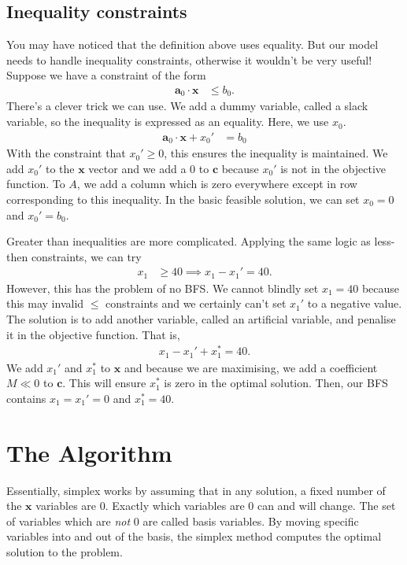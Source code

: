 \documentclass[12pt,a4paper]{article} %
\begin{document}
\subsection{Inequality constraints}
You may have noticed that the definition above uses 
equality. But our model needs to handle inequality constraints, otherwise 
it wouldn't be very useful! Suppose we have a constraint of the form 
\begin{align*}
    \bm a_0 \cdot \bm x &\le b_0.
\end{align*}
There's a clever trick we can use. We add a dummy variable, called a 
slack variable, so the inequality is expressed as an equality. 
Here, we use $x_0$.
\begin{align*}
    \bm a_0 \cdot \bm x + x_0' &= b_0
\end{align*}
With the constraint that $x_0' \ge 0$, this ensures the inequality is 
maintained. 
We add $x_0'$ to the $\bm x$ vector 
and we add a $0$ to $\bm c$ because $x_0'$ is not in the objective function. To $A$, we add 
a column which is zero everywhere except in row corresponding to
this inequality. In the basic feasible solution, we can set 
$x_0=0$ and $x_0' = b_0$.

Greater than inequalities are more complicated. Applying the same logic 
as less-then constraints, we can try
\begin{align*}
    x_1 &\ge 40 \implies x_1-x_1' = 40.
\end{align*}
However, this has the problem of no BFS. We cannot blindly set $x_1=40$ 
because this may invalid $\le$ constraints and we certainly
can't set $x_1'$ to a negative value. The solution is to add another 
variable, called an artificial variable, and penalise it in the objective 
function. That is, 
\begin{align*}
    x_1 - x_1' + x_1^* = 40.
\end{align*}
We add $x_1'$ and $x_1^*$ to $\bm x$ and because we are maximising, 
we add a coefficient $M \ll 0$ to $\bm c$. This will 
ensure $x_1^*$ is zero in the optimal solution. Then, our BFS contains 
$x_1 = x_1' = 0$ and $x_1^* = 40$.

\section{The Algorithm}
Essentially, simplex works by assuming that in any solution,
a fixed number of the $\bm x$ variables are 0. Exactly which 
variables are 0 can and will change. The set of variables which 
are \textit{not} 0 are called basis variables. By moving specific 
variables into and out of the basis, 
the simplex method computes the optimal solution
 to the problem.
\end{document}
